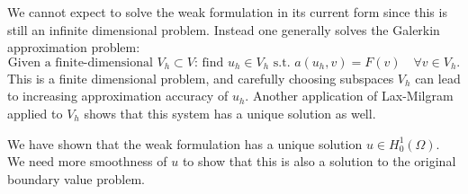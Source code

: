 \documentclass[thesis.tex]{subfiles}
\begin{document}
We cannot expect to solve the weak formulation in its current form since this is still an infinite dimensional problem.
Instead one generally solves the Galerkin approximation problem:
\begin{equation}
  \label{eq:galerk_finite}
  \text{Given a finite-dimensional } V_h \subset V \text{: find $u_h \in V_h$ s.t. } a(u_h, v) = F(v) \quad \forall v \in V_h.
\end{equation}
This is a finite dimensional problem, and carefully choosing subspaces $V_h$ can lead to increasing approximation accuracy of $u_h$. Another application of Lax-Milgram applied to $V_h$ shows that this system has a unique solution as well.

\begin{rem}
  We have shown that the weak formulation has a unique solution $u \in H_0^1(\Omega)$. We need more smoothness of $u$ to show that this is also a solution to the original boundary value problem.
\end{rem}
\end{document}
